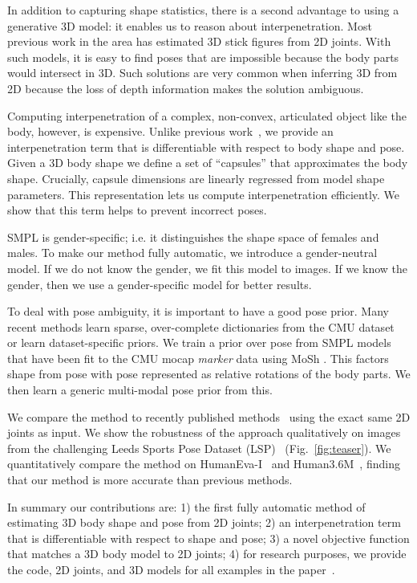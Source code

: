 \documentclass[runningheads]{llncs}
\begin{document}
In addition to capturing shape statistics, there is a second advantage
to using a generative 3D model: it enables us to reason about
interpenetration.
Most previous work in the area has estimated 3D stick figures from 2D joints.
With such models, it is easy to find poses that are impossible because
the body parts would intersect in 3D.
Such solutions are very common when inferring 3D from 2D because the
loss of depth information makes the solution ambiguous.

Computing interpenetration of a complex, non-convex, articulated object
like the body, however, is expensive.
Unlike previous work~\cite{Guan:2009,GuanThesis}, we provide an interpenetration term that is differentiable with respect to body shape and pose.
Given a 3D body shape we define a set of ``capsules'' that approximates the body shape.
Crucially, capsule dimensions are linearly regressed from model shape parameters.
This representation lets us compute interpenetration efficiently.
We show that this term helps to prevent incorrect poses.

SMPL is gender-specific; i.e. it distinguishes the shape space of females and males.
To make our method fully automatic, we introduce a gender-neutral model.
If we do not know the gender, we fit this model to images. If we know the gender, then we
use a gender-specific model for better results.

To deal with pose ambiguity, it is important to have a good pose
prior. Many recent methods learn sparse, over-complete dictionaries
from the CMU dataset~\cite{cmu} or learn dataset-specific priors.
We train a prior over pose from SMPL models that have been fit to the CMU
mocap {\em marker} data \cite{cmu} using MoSh \cite{Loper:SIGASIA:2014}.
This factors shape from pose with pose represented as relative
rotations of the body parts.
We then learn a generic multi-modal pose prior from this.

We compare the method to recently published methods~\cite{Akhter:2015,Ramakrishna:2012,Zhou:2015b} using the exact
same 2D joints as input. We show the robustness of the approach
qualitatively on images from the challenging Leeds Sports Pose Dataset (LSP)~\cite{LSP:2010} (Fig.~\ref{fig:teaser}).
We quantitatively compare the method on HumanEva-I~\cite{HumanEva:2010} and Human3.6M~\cite{Human36m:2014}, finding that our method is more accurate than previous methods.

In summary our contributions are:
1) the first fully automatic method of estimating 3D body shape and pose from 2D joints;
2) an interpenetration term that is differentiable with respect to shape and pose;
3) a novel objective function that matches a 3D body model to 2D
joints;
4) for research purposes, we provide the code, 2D joints, and 3D models for all examples in
the paper~\cite{simplifyweb}.
 
\end{document}

